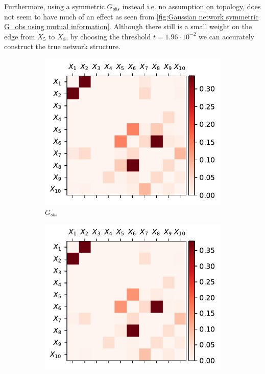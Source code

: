 \documentclass[../Thesis.tex]{subfiles}
\begin{document}
Furthermore, using a symmetric $G_{obs}$ instead i.e. no assumption on topology, does not seem to have much of an effect as seen from \autoref{fig:Gaussian network symmetric G_obs using mutual information}. Although there still is a small weight on the edge from $X_5$ to $X_8$, by choosing the threshold $t = 1.96 \cdot 10^{-2}$ we can accurately construct the true network structure.
\begin{figure}[ht]
    \centering
    \begin{subfigure}[t]{0.49\textwidth}
        \centering
        \includegraphics[width=.95\linewidth]{figures/Gaussian Network Theoretical/symmetric G obs - MI.pdf}
        \caption{$G_{obs}$}
    \end{subfigure}
    \hfill
    \begin{subfigure}[t]{0.49\textwidth}
        \centering
        \includegraphics[width=.95\linewidth]{figures/Gaussian Network Theoretical/G dir from symmetric G obs - MI.pdf}

\end{subfigure}
\end{figure}
\end{document}
